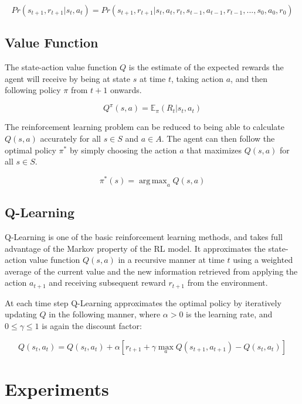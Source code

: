 \documentclass[11pt, oneside]{article}   	%
\DeclareMathOperator*{\argmax}{arg\,max}
\begin{document}
\begin{equation}
Pr(s_{t+1}, r_{t+1} | s_t, a_t) = Pr(s_{t+1}, r_{t+1} | s_t,a_t, r_t, s_{t-1}, a_{t-1}, r_{t-1},...,s_0, a_0, r_0)
\end{equation}

\subsection{Value Function}
The state-action value function $Q$ is the estimate of the expected rewards the agent will receive by being at state $s$ at time $t$, taking action $a$, and then following policy $\pi$ from $t+1$ onwards. 

\begin{equation}
Q^\pi(s,a) = \mathbb{E}_\pi(R_t | s_t, a_t)
\end{equation}

The reinforcement learning problem can be reduced to being able to calculate $Q(s,a)$ accurately for all $s \in S$ and  $a \in A$. The agent can then follow the optimal policy $\pi^*$ by simply choosing the action $a$ that maximizes $Q(s,a)$ for all $s \in S$.

\begin{equation}
\pi^*(s) = \argmax_a{Q(s,a)}
\end{equation}

\subsection{Q-Learning}

Q-Learning is one of the basic reinforcement learning methods, and takes full advantage of the Markov property of the RL model. It approximates the state-action value function $Q(s,a)$ in a recursive manner at time $t$ using a weighted average of the current value and the new information retrieved from applying the action $a_{t+1}$ and receiving subsequent reward $r_{t+1}$ from the environment. 

\hfill

At each time step Q-Learning approximates the optimal policy by iteratively updating $Q$ in the following manner, where $\alpha > 0$ is the learning rate, and $0 \leq \gamma \leq 1$ is again the discount factor:

\begin{equation}
Q(s_t, a_t) = Q(s_t, a_t) + \alpha[r_{t+1} + \gamma \max_aQ(s_{t+1}, a_{t+1}) - Q(s_t, a_t)]
\end{equation}

\section{Experiments}
\end{document}
